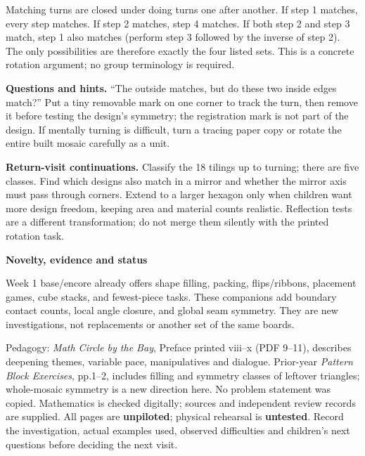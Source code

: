 \documentclass[11pt]{article}
\newcommand\lead[1]{\textbf{#1}\par}
\begin{document}
Matching turns are closed under doing turns one after another. If step 1 matches, every step matches. If step 2 matches, step 4 matches. If both step 2 and step 3 match, step 1 also matches (perform step 3 followed by the inverse of step 2). The only possibilities are therefore exactly the four listed sets. This is a concrete rotation argument; no group terminology is required.

\textbf{Questions and hints.} ``The outside matches, but do these two inside edges match?'' Put a tiny removable mark on one corner to track the turn, then remove it before testing the design's symmetry; the registration mark is not part of the design. If mentally turning is difficult, turn a tracing paper copy or rotate the entire built mosaic carefully as a unit.

\textbf{Return-visit continuations.} Classify the 18 tilings up to turning; there are five classes. Find which designs also match in a mirror and whether the mirror axis must pass through corners. Extend to a larger hexagon only when children want more design freedom, keeping area and material counts realistic. Reflection tests are a different transformation; do not merge them silently with the printed rotation task.

\lead{Novelty, evidence and status}
Week 1 base/encore already offers shape filling, packing, flips/ribbons, placement games, cube stacks, and fewest-piece tasks. These companions add boundary contact counts, local angle closure, and global seam symmetry. They are new investigations, not replacements or another set of the same boards.

Pedagogy: \emph{Math Circle by the Bay}, Preface printed viii--x (PDF 9--11), describes deepening themes, variable pace, manipulatives and dialogue. Prior-year \emph{Pattern Block Exercises}, pp.1--2, includes filling and symmetry classes of leftover triangles; whole-mosaic symmetry is a new direction here. No problem statement was copied. Mathematics is checked digitally; sources and independent review records are supplied. All pages are \textbf{unpiloted}; physical rehearsal is \textbf{untested}. Record the investigation, actual examples used, observed difficulties and children's next questions before deciding the next visit.
\end{document}
